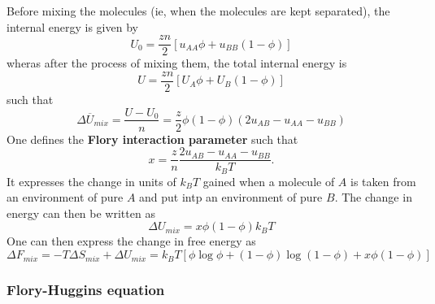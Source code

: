 \documentclass[../phys-f308.tex]{subfiles}
\begin{document}
\begin{example}
\begin{itemize}
        Before mixing the molecules (ie, when the molecules are kept separated), the internal energy is given by
        \begin{equation}
            U_0 = \frac{zn}{2}\left[u_{AA}\phi+u_{BB}\left(1-\phi\right)\right]
        \end{equation}
        wheras after the process of mixing them, the total internal energy is
        \begin{equation}
            U = \frac{zn}{2}\left[U_A\phi+U_B\left(1-\phi\right)\right]
        \end{equation}
        such that
        \begin{equation}
            \Delta\overline{U}_{mix} = \frac{U-U_0}{n} = \frac{z}{2}\phi\left(1-\phi\right)\left(2u_{AB}-u_{AA}-u_{BB}\right)
        \end{equation}
        One defines the \color{purple}\textbf{Flory interaction parameter }\color{black} such that
        \begin{equation}
            x = \frac{z}{n}\frac{2u_{AB}-u_{AA}-u_{BB}}{k_BT}.
        \end{equation}
        It expresses the change in units of $k_BT$ gained when a molecule of $A$ is taken from an environment of pure $A$ and put intp an environment of pure $B$. The change in energy can then be written as
        \begin{equation}
            \Delta U_{mix} = x\phi\left(1-\phi\right)k_BT
        \end{equation}
        One can then express the change in free energy as
        \begin{equation}\label{eq: free energy mixture}
            \Delta F_{mix} = -T\Delta S_{mix} + \Delta U_{mix} = k_BT\left[\phi\log\phi+(1-\phi)\log\left(1-\phi\right)+x\phi\left(1-\phi\right)\right]
        \end{equation}
        \end{itemize}
    \end{example}

    \subsubsection{Flory-Huggins equation}
\end{document}

